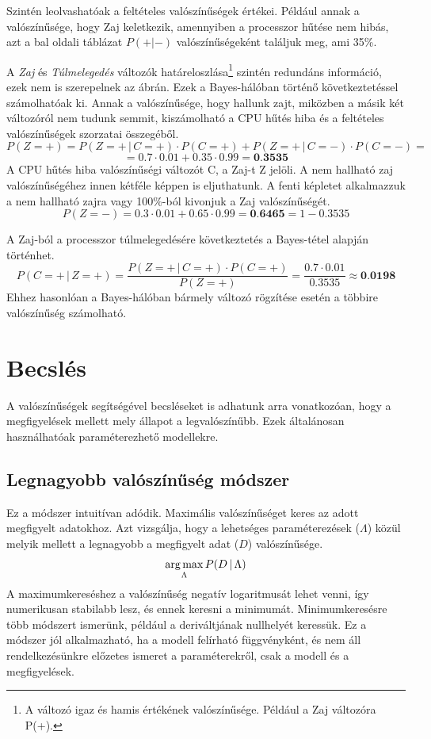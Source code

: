 Szintén leolvashatóak a feltételes valószínűségek értékei. Például annak a valószínűsége, hogy Zaj keletkezik, amennyiben a processzor hűtése nem hibás, azt a bal oldali táblázat $P(+|-)$ valószínűségeként találjuk meg, ami 35\%.

A \emph{Zaj} és \emph{Túlmelegedés} változók határeloszlása\footnote{A változó igaz és hamis értékének valószínűsége. Például a Zaj változóra P(+).} szintén redundáns információ, ezek nem is szerepelnek az ábrán. Ezek a Bayes-hálóban történő következtetéssel számolhatóak ki. Annak a valószínűsége, hogy hallunk zajt, miközben a másik két változóról nem tudunk semmit, kiszámolható a CPU hűtés hiba és a feltételes valószínűségek szorzatai összegéből.
$$P(Z=+) = P(Z=+\,|\,C=+) \cdot P(C=+) + P(Z=+\,|\,C=-) \cdot P(C=-) =$$
$$= 0.7 \cdot 0.01 + 0.35 \cdot 0.99 = \textbf{0.3535} $$
A CPU hűtés hiba valószínűségi változót C, a Zaj-t Z jelöli. A nem hallható zaj valószínűségéhez innen kétféle képpen is eljuthatunk. A fenti képletet alkalmazzuk a nem hallható zajra vagy 100\%-ból kivonjuk a Zaj valószínűségét.
$$P(Z=-) = 0.3 \cdot 0.01 + 0.65 \cdot 0.99 = \textbf{0.6465} = 1-0.3535 $$

A Zaj-ból a processzor túlmelegedésére következtetés a Bayes-tétel alapján történhet.
$$P(C=+\,|\,Z=+) = \frac{P(Z=+\,|\,C=+) \cdot P(C=+)}{P(Z=+)} = \frac{0.7 \cdot 0.01}{0.3535} \approx \textbf{0.0198}$$
Ehhez hasonlóan a Bayes-hálóban bármely változó rögzítése esetén a többire valószínűség számolható.


\section{Becslés}
A valószínűségek segítségével becsléseket is adhatunk arra vonatkozóan, hogy a megfigyelések mellett mely állapot a legvalószínűbb. Ezek általánosan használhatóak paraméterezhető modellekre.

\subsection{Legnagyobb valószínűség módszer}
Ez a módszer intuitívan adódik. Maximális valószínűséget keres az adott megfigyelt adatokhoz. Azt vizsgálja, hogy a lehetséges paraméterezések ($\Lambda$) közül melyik mellett a legnagyobb a megfigyelt adat ($D$) valószínűsége.
$$\operatorname*{arg\,max}_{\Lambda}{P(D\,|\,\Lambda)}$$
A maximumkereséshez a valószínűség negatív logaritmusát lehet venni, így numerikusan stabilabb lesz, és ennek keresni a minimumát. Minimumkeresésre több módszert ismerünk, például a deriváltjának nullhelyét keressük. Ez a módszer jól alkalmazható, ha a modell felírható függvényként, és nem áll rendelkezésünkre előzetes ismeret a paraméterekről, csak a modell és a megfigyelések.

